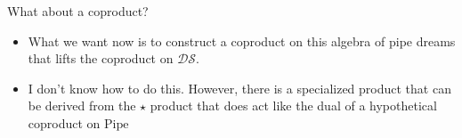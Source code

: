 \documentclass[aspectratio=169]{beamer}
\newcommand{\coma}{\mathbf{S}}
\newcommand{\dcoma}{\mathcal{DS}}
\newcommand{\RC}{\mathrm{Pipe}}
\begin{document}





\begin{frame}{What about a coproduct?}
  \begin{itemize}
  \item What we want now is to construct a coproduct on this algebra of pipe dreams that lifts the coproduct on $\dcoma$.
  \item I don't know how to do this. However, there is a specialized product that can be derived from the $\star$ product that does act like the dual of a hypothetical coproduct on $\RC$
  \end{itemize}
\end{frame}
\end{document}
